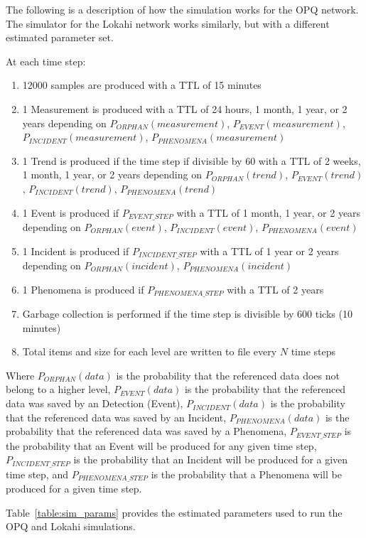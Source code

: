 The following is a description of how the simulation works for the OPQ network. The simulator for the Lokahi network works similarly, but with a different estimated parameter set.

At each time step:
\begin{enumerate}
	\item 12000 samples are produced with a TTL of 15 minutes
	\item 1 Measurement is produced with a TTL of 24 hours, 1 month, 1 year, or 2 years depending on $P_{ORPHAN}(measurement)$, $P_{EVENT}(measurement)$, $P_{INCIDENT}(measurement)$, $P_{PHENOMENA}(measurement)$
	\item 1 Trend is produced if the time step if divisible by 60 with a TTL of 2 weeks, 1 month, 1 year, or 2 years depending on $P_{ORPHAN}(trend)$, $P_{EVENT}(trend)$, $P_{INCIDENT}(trend)$, $P_{PHENOMENA}(trend)$
	\item 1 Event is produced if $P_{EVENT\_STEP}$ with a TTL of 1 month, 1 year, or 2 years depending on $P_{ORPHAN}(event)$, $P_{INCIDENT}(event)$, $P_{PHENOMENA}(event)$
	\item 1 Incident is produced if $P_{INCIDENT\_STEP}$ with a TTL of 1 year or 2 years depending on $P_{ORPHAN}(incident)$, $P_{PHENOMENA}(incident)$
	\item 1 Phenomena is produced if $P_{PHENOMENA\_STEP}$ with a TTL of 2 years
	\item Garbage collection is performed if the time step is divisible by 600 ticks (10 minutes)
	\item Total items and size for each level are written to file every $N$ time steps
\end{enumerate}

Where $P_{ORPHAN}(data)$ is the probability that the referenced data does not belong to a higher level, $P_{EVENT}(data)$ is the probability that the referenced data was saved by an Detection (Event), $P_{INCIDENT}(data)$ is the probability that the referenced data was saved by an Incident, $P_{PHENOMENA}(data)$ is the probability that the referenced data was saved by a Phenomena, $P_{EVENT\_STEP}$ is the probability that an Event will be produced for any given time step, $P_{INCIDENT\_STEP}$ is the probability that an Incident will be produced for a given time step, and $P_{PHENOMENA\_STEP}$ is the probability that a Phenomena will be produced for a given time step.

Table~\ref{table:sim_params} provides the estimated parameters used to run the OPQ and Lokahi simulations.

